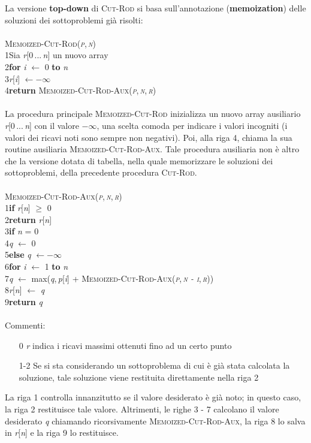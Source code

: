 \documentclass[10pt, a4paper]{report}
\newcommand\firsttab[1][0.5cm]{\hspace*{#1}}
\newcommand\secondtab[1][1cm]{\hspace*{#1}}
\newcommand\thirdtab[1][1.5cm]{\hspace*{#1}}
\begin{document}
La versione \textbf{top-down} di \textsc{Cut-Rod} si basa sull'annotazione (\textbf{memoization}) delle soluzioni dei sottoproblemi già risolti:\\\\
\textsc{Memoized-Cut-Rod(\textit{p},\,\textit{n})}\\
1\firsttab Sia \textit{r}[0\,...\,\textit{n}] un nuovo array\\
2\firsttab\textbf{for} \textit{i} $\leftarrow$ 0 \textbf{to} \textit{n}\\
3\secondtab\textit{r}[\textit{i}] $\leftarrow -\infty$\\
4\firsttab\textbf{return} \textsc{Memoized-Cut-Rod-Aux(\textit{p},\,\textit{n},\,\textit{r})}\\\\
La procedura principale \textsc{Memoized-Cut-Rod} inizializza un nuovo array ausiliario \textit{r}[0\,...\,\textit{n}] con il valore $-\infty$, una scelta comoda per indicare i valori incogniti (i valori dei ricavi noti sono sempre non negativi). Poi, alla riga 4, chiama la sua routine ausiliaria \textsc{Memoized-Cut-Rod-Aux}. Tale procedura ausiliaria non è altro che la versione dotata di tabella, nella quale memorizzare le soluzioni dei sottoproblemi, della precedente procedura \textsc{Cut-Rod}.\\\\
\textsc{Memoized-Cut-Rod-Aux(\textit{p},\,\textit{n},\,\textit{r})}\\
1\firsttab\textbf{if} \textit{r}[\textit{n}] $\geq$ 0\\
2\secondtab\textbf{return} \textit{r}[\textit{n}]\\
3\firsttab\textbf{if} \textit{n} = 0\\
4\secondtab\textit{q} $\leftarrow$ 0\\
5\firsttab\textbf{else} \textit{q} $\leftarrow -\infty$\\
6\secondtab\textbf{for} \textit{i} $\leftarrow$ 1 \textbf{to} \textit{n}\\
7\thirdtab\textit{q} $\leftarrow$ max(\textit{q},\,\textit{p}[\textit{i}] + \textsc{Memoized-Cut-Rod-Aux(\textit{p},\,\textit{n - i},\,\textit{r})})\\
8\firsttab\textit{r}[\textit{n}] $\leftarrow$ \textit{q}\\
9\firsttab\textbf{return} \textit{q}\\\\
Commenti:
\begin{enumerate}
\item[0]\textit{r} indica i ricavi massimi ottenuti fino ad un certo punto
\item[1-2]Se si sta considerando un sottoproblema di cui è già stata calcolata la soluzione, tale soluzione viene restituita direttamente nella riga 2
\end{enumerate}
La riga 1 controlla innanzitutto se il valore desiderato è già noto; in questo caso, la riga 2 restituisce tale valore. Altrimenti, le righe 3 - 7 calcolano il valore desiderato \textit{q} chiamando ricorsivamente \textsc{Memoized-Cut-Rod-Aux}, la riga 8 lo salva in \textit{r}[\textit{n}] e la riga 9 lo restituisce.\\
\end{document}
